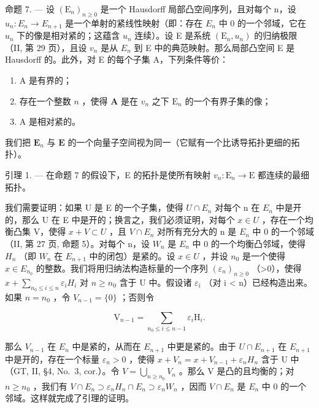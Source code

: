 命题 7. --- 设 \((\mathrm{E}_{n})_{n\geq0}\) 是一个 Hausdorff 局部凸空间序列，且对每个 n，设 \(u_{n}:E_{n}\to E_{n+1}\) 是一个单射的紧线性映射（即：存在 \(E_{n}\) 中 0 的一个邻域，它在 \(u_{n}\) 下的像是相对紧的；这蕴含 \(u_{n}\) 连续）。设 E 是系统 \((\mathrm{E}_{n},u_{n})\) 的归纳极限（II, 第 29 页），且设 \(v_{n}\) 是从 \(E_{n}\) 到 E 中的典范映射。那么局部凸空间 E 是 Hausdorff 的。此外，对 E 的每个子集 A，下列条件等价：

\begin{enumerate}
\def\labelenumi{(\roman{enumi})}
\item
  A 是有界的；
\item
  存在一个整数 \(n\) ，使得 \(\mathbf{A}\) 是在 \(v_{n}\) 之下 \(\mathrm{E}_n\) 的一个有界子集的像；
\item
  A 是相对紧的。
\end{enumerate}

我们把 \(\mathbf{E}_n\) 与 \(\mathbf{E}\) 的一个向量子空间视为同一（它赋有一个比诱导拓扑更细的拓扑）。

引理 1. --- 在命题 7 的假设下，E 的拓扑是使所有映射 \(v_{n} : \mathrm{E}_{n} \to \mathrm{E}\) 都连续的最细拓扑。

我们需要证明：如果 U 是 E 的一个子集，使得 \(U \cap E_{n}\) 对每个 n 在 \(E_{n}\) 中是开的，那么 U 在 E 中是开的；换言之，我们必须证明，对每个 \(x \in U\) ，存在一个均衡凸集 V，使得 \(x + V \subset U\) ，且 \(V \cap E_{n}\) 对所有充分大的 n 是 \(E_{n}\) 中 0 的一个邻域（II, 第 27 页, 命题 5）。对每个 n，设 \(W_{n}\) 是 \(E_{n}\) 中 0 的一个均衡凸邻域，使得 \(H_{n}\) （即 \(W_{n}\) 在 \(E_{n+1}\) 中的闭包）是紧的。设 \(x \in U\) ，并设 \(n_{0}\) 是一个使得 \(x \in E_{n_{0}}\) 的整数。我们将用归纳法构造标量的一个序列 \((\varepsilon_{n})_{n \geqslant 0}\) （\textgreater0），使得 \(x + \sum_{n_{0} \leqslant i \leqslant n} \varepsilon_{i}H_{i}\) 对 \(n \geqslant n_{0}\) 含于 U 中。假设诸 \(\varepsilon_{i}\) （对 i \textless{} n）已经构造出来。如果 \(n = n_{0}\) ，令 \(V_{n-1} = \{0\}\) ；否则令

\[
\mathrm{V} _ {n - 1} = \sum_ {n _ {0} \leqslant i \leqslant n - 1} \varepsilon_ {i} \mathrm{H} _ {i}.
\]

那么 \(V_{n-1}\) 在 \(E_{n}\) 中是紧的，从而在 \(E_{n+1}\) 中更是紧的。由于 \(U \cap E_{n+1}\) 在 \(E_{n+1}\) 中是开的，存在一个标量 \(\varepsilon_{n} > 0\) ，使得 \(x + V_{n} = x + V_{n-1} + \varepsilon_{n}H_{n}\) 含于 U 中（GT, II, §4, No.~3, cor.）。令 \(V = \bigcup_{n \geqslant n_{0}} V_{n}\) 。那么 V 是凸的且均衡的；对 \(n \geqslant n_{0}\) ，我们有 \(V \cap E_{n} \supset \varepsilon_{n}H_{n} \cap E_{n} \supset \varepsilon_{n}W_{n}\) ，因而 \(V \cap E_{n}\) 是 \(E_{n}\) 中 0 的一个邻域。这样就完成了引理的证明。

